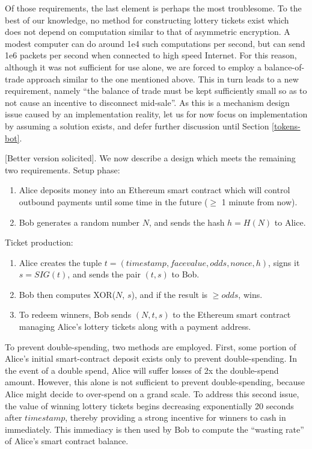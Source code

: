 \documentclass{article}
\begin{document}
Of those requirements, the last element is perhaps the most troublesome. To the best of our knowledge, no method for constructing lottery tickets exist which does not depend on computation similar to that of asymmetric encryption. A modest computer can do around 1e4 such computations per second, but can send 1e6 packets per second when connected to high speed Internet. For this reason, although it was not sufficient for use alone, we are forced to employ a balance-of-trade approach similar to the one mentioned above. This in turn leads to a new requirement, namely ``the balance of trade must be kept sufficiently small so as to not cause an incentive to disconnect mid-sale''. As this is a mechanism design issue caused by an implementation reality, let us for now focus on implementation by assuming a solution exists, and defer further discussion until Section \ref{tokens-bot}.

[Better version solicited]. We now describe a design which meets the remaining two requirements. Setup phase:

\begin{enumerate}
    \item Alice deposits money into an Ethereum smart contract which will control outbound payments until some time in the future ($\geq$ 1 minute from now).
    \item Bob generates a random number $N$, and sends the hash $h=H(N)$ to Alice.
\end{enumerate}

Ticket production:

\begin{enumerate}
    \item Alice creates the tuple $t = (timestamp, face value, odds, nonce, h)$, signs it $s = SIG(t)$, and sends the pair $(t, s)$ to Bob.
    \item Bob then computes XOR($N$, $s$), and if the result is $\geq odds$, wins.
    \item To redeem winners, Bob sends $(N, t, s)$ to the Ethereum smart contract managing Alice's lottery tickets along with a payment address.
\end{enumerate}

To prevent double-spending, two methods are employed. First, some portion of Alice's initial smart-contract deposit exists only to prevent double-spending. In the event of a double spend, Alice will suffer losses of 2x the double-spend amount. However, this alone is not sufficient to prevent double-spending, because Alice might decide to over-spend on a grand scale. To address this second issue, the value of winning lottery tickets begins decreasing exponentially 20 seconds after $timestamp$, thereby providing a strong incentive for winners to cash in immediately. This immediacy is then used by Bob to compute the ``wasting rate'' of Alice's smart contract balance.
\end{document}

